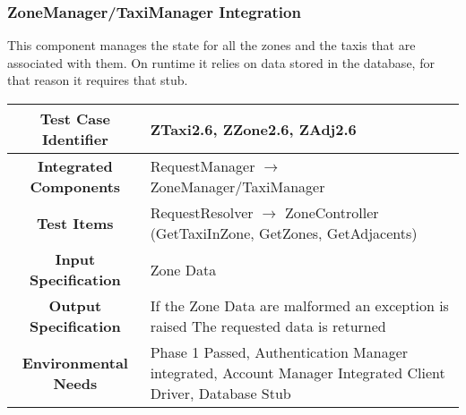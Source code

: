 \documentclass[11pt, a4paper,titlepage]{article}
\begin{document}
	 \subsubsection{ZoneManager/TaxiManager Integration}
	 This component manages the state for all the zones and the taxis that are associated with them. On runtime it relies on data stored in the database, for that reason it requires that stub.
	 \newline
	 \begin{tabularx}{\textwidth}{| c|X|}
	 	\hline \textbf{Test Case Identifier} & \label{ZTaxi2.6}ZTaxi2.6, \label{ZZone2.6}ZZone2.6, \label{ZAdj2.6}ZAdj2.6 \\
	 	\hline \textbf{Integrated Components} & RequestManager  $\rightarrow $  ZoneManager/TaxiManager \\
	 	\hline \textbf{Test Items} & RequestResolver $\rightarrow $ ZoneController (GetTaxiInZone, GetZones, GetAdjacents) \\
	 	\hline \textbf{Input Specification} & Zone Data \\
	 	\hline \textbf{Output Specification} & If the Zone Data are malformed an exception is raised \newline
											The requested data is returned \\
	 	\hline \textbf{Environmental Needs} &  Phase 1 Passed, Authentication Manager integrated, Account Manager Integrated \newline 
	 	Client Driver, Database Stub\\
	 	\hline
	 	\end{tabularx}
	 	\newline
\end{document}
